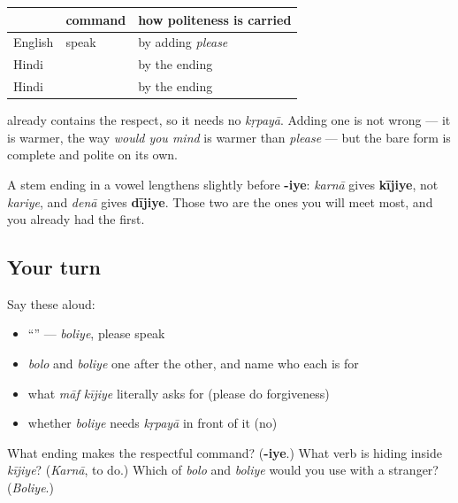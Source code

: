\begin{grammarlens}[title={Grammar Lens: politeness is built in, not added on}]
\noindent
\begin{tabularx}{\linewidth}{@{}>{\raggedright\arraybackslash}X>{\raggedright\arraybackslash}X>{\raggedright\arraybackslash}X@{}}
\toprule
\textbf{} & \textbf{command} & \textbf{how politeness is carried} \\
\midrule
English & speak & by adding \emph{please} \\
Hindi \hi{तुम} & \hi{बोलो} & by the ending \\
Hindi \hi{आप} & \hi{बोलिए} & by the ending \\
\bottomrule
\end{tabularx}

\textbf{} already contains the respect, so it needs no \emph{kṛpayā}. Adding one is not wrong — it is warmer, the way \emph{would you mind} is warmer than \emph{please} — but the bare form is complete and polite on its own.

A stem ending in a vowel lengthens slightly before \textbf{-iye}: \emph{karnā} gives \textbf{kījiye}, not \emph{kariye}, and \emph{denā} gives \textbf{dījiye}. Those two are the ones you will meet most, and you already had the first.
\end{grammarlens}

\subsection*{Your turn}
Say these aloud:

\begin{itemize}
\raggedright
  \item \textquotedblleft{}\textquotedblright{} — \emph{boliye}, please speak
  \item \emph{bolo} and \emph{boliye} one after the other, and name who each is for
  \item what \emph{māf kījiye} literally asks for (please do forgiveness)
  \item whether \emph{boliye} needs \emph{kṛpayā} in front of it (no)
\end{itemize}

\begin{tcolorbox}[breakable,colback=teal!4,colframe=teal!35!black,title={Before you move on}]
What ending makes the respectful command? (\textbf{-iye}.) What verb is hiding inside \emph{kījiye}? (\emph{Karnā}, to do.) Which of \emph{bolo} and \emph{boliye} would you use with a stranger? (\emph{Boliye}.)
\end{tcolorbox}
